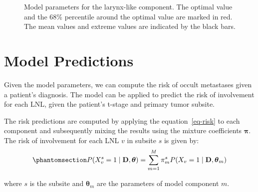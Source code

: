 \documentclass[
  sn-mathphys-num,
]{sn-jnl}
\begin{document}
\begin{figure}


\caption{\label{fig-4_larynx_parameters}Model parameters for the
larynx-like component. The optimal value and the 68\% percentile around
the optimal value are marked in red. The mean values and extreme values
are indicated by the black bars.}

\end{figure}%

\section{Model Predictions}\label{sec-model_pred}

Given the model parameters, we can compute the risk of occult metastases
given a patient's diagnosis. The model can be applied to predict the
risk of involvement for each LNL, given the patient's t-stage and
primary tumor subsite.

The risk predictions are computed by applying the equation~\ref{eq-risk}
to each component and subsequently mixing the results using the mixture
coefficients \(\boldsymbol{\pi}\). The risk of involvement for each LNL
\(v\) in subsite \(s\) is given by:
\begin{equation}\phantomsection\label{eq-risk-mixing}{
P(X_v^s=1 \mid \mathbf{D}, \boldsymbol{\theta}) = \sum_{m=1}^M \pi_m^{s} P(X_v=1 \mid \mathbf{D}, \boldsymbol{\theta}_m)
}\end{equation}

where \(s\) is the subsite and \(\boldsymbol{\theta}_m\) are the
parameters of model component \(m\).
\end{document}
